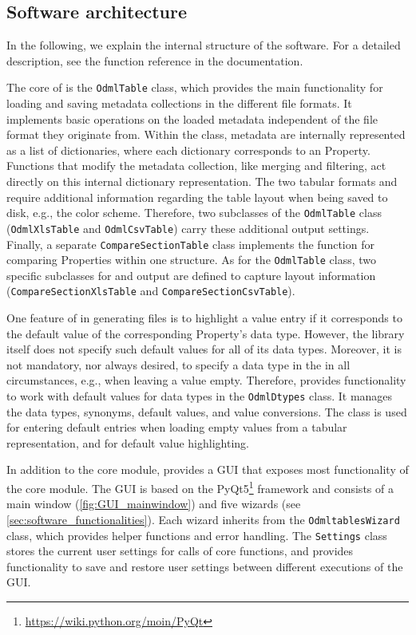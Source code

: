 \subsection{Software architecture}
\label{sub:Software-Architecture}

In the following, we explain the internal structure of the  software. For a detailed description, see the function reference in the  documentation.

The core of  is the \texttt{OdmlTable} class, which provides the main functionality for loading and saving metadata collections in the different file formats. It implements basic operations on the loaded metadata independent of the file format they originate from. Within the class, metadata are internally represented as a list of dictionaries, where each dictionary corresponds to an  Property. Functions that modify the metadata collection, like merging and filtering, act directly on this internal dictionary representation. The two tabular formats  and  require additional information regarding the table layout when being saved to disk, e.g., the color scheme. Therefore, two subclasses of the \texttt{OdmlTable} class (\texttt{OdmlXlsTable} and \texttt{OdmlCsvTable}) carry these additional output settings. Finally, a separate \texttt{CompareSectionTable} class implements the function for comparing Properties within one  structure. As for the \texttt{OdmlTable} class, two specific subclasses for  and  output are defined to capture layout information (\texttt{CompareSectionXlsTable} and \texttt{CompareSectionCsvTable}).

One feature of  in generating  files is to highlight a value entry if it corresponds to the default value of the corresponding Property's data type. However, the  library itself does not specify such default values for all of its data types. Moreover, it is not mandatory, nor always desired, to specify a data type in the  in all circumstances, e.g., when leaving a value empty. Therefore,  provides functionality to work with default values for data types in the \texttt{OdmlDtypes} class. It manages the data types, synonyms, default values, and value conversions. The class is used for entering default entries when loading empty values from a tabular representation, and for default value highlighting.

In addition to the core module,  provides a GUI that exposes most functionality of the core module. The GUI is based on the PyQt5\footnote{\url{https://wiki.python.org/moin/PyQt}} framework and consists of a main window (\cref{fig:GUI_mainwindow}) and five wizards (see \cref{sec:software_functionalities}). Each wizard inherits from the \texttt{OdmltablesWizard} class, which provides helper functions and error handling. The \texttt{Settings} class stores the current user settings for calls of  core functions, and provides functionality to save and restore user settings between different executions of the GUI.


